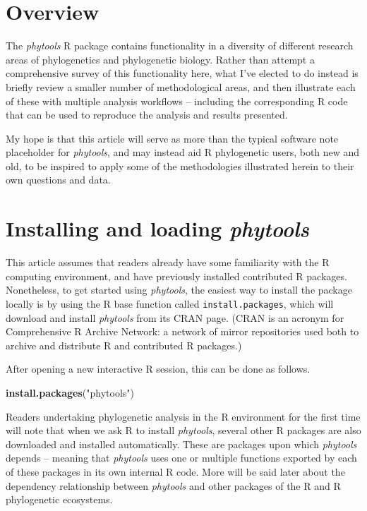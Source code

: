 \documentclass[fleqn,10pt,lineno]{wlpeerj} %
\newenvironment{Shaded}{\begin{snugshade}}{\end{snugshade}}
\newcommand{\FunctionTok}[1]{\textcolor[rgb]{0.13,0.29,0.53}{\textbf{#1}}}
\newcommand{\NormalTok}[1]{#1}
\newcommand{\StringTok}[1]{\textcolor[rgb]{0.31,0.60,0.02}{#1}}
\begin{document}
\hypertarget{overview}{%
\section{Overview}\label{overview}}

The \emph{phytools} R package contains functionality in a diversity of different research areas of phylogenetics and phylogenetic biology. Rather than attempt a comprehensive survey of this functionality here, what I've elected to do instead is briefly review a smaller number of methodological areas, and then illustrate each of these with multiple analysis workflows -- including the corresponding R code that can be used to reproduce the analysis and results presented.

My hope is that this article will serve as more than the typical software note placeholder for \emph{phytools}, and may instead aid R phylogenetic users, both new and old, to be inspired to apply some of the methodologies illustrated herein to their own questions and data.

\hypertarget{installing-and-loading-phytools}{%
\section{\texorpdfstring{Installing and loading \emph{phytools}}{Installing and loading phytools}}\label{installing-and-loading-phytools}}

This article assumes that readers already have some familiarity with the R computing environment, and have previously installed contributed R packages. Nonetheless, to get started using \emph{phytools}, the easiest way to install the package locally is by using the R base function called \texttt{install.packages}, which will download and install \emph{phytools} from its CRAN page. (CRAN is an acronym for Comprehensive R Archive Network: a network of mirror repositories used both to archive and distribute R and contributed R packages.)

After opening a new interactive R session, this can be done as follows.

\begin{Shaded}
\begin{Highlighting}[]
\FunctionTok{install.packages}\NormalTok{(}\StringTok{"phytools"}\NormalTok{)}
\end{Highlighting}
\end{Shaded}

Readers undertaking phylogenetic analysis in the R environment for the first time will note that when we ask R to install \emph{phytools}, several other R packages are also downloaded and installed automatically. These are packages upon which \emph{phytools} depends -- meaning that \emph{phytools} uses one or multiple functions exported by each of these packages in its own internal R code. More will be said later about the dependency relationship between \emph{phytools} and other packages of the R and R phylogenetic ecosystems.
\end{document}

